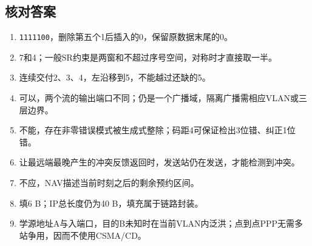 \subsection{核对答案}\label{CN03-review-answers}

\begin{enumerate}
\def\labelenumi{\arabic{enumi}.}
\tightlist
\item
  \texttt{1111100}，删除第五个1后插入的0，保留原数据末尾的0。
\item
  7和4；一般SR约束是两窗和不超过序号空间，对称时才直接取一半。
\item
  连续交付2、3、4，左沿移到5，不能越过还缺的5。
\item
  可以，两个流的输出端口不同；仍是一个广播域，隔离广播需相应VLAN或三层边界。
\item
  不能，存在非零错误模式被生成式整除；码距4可保证检出3位错、纠正1位错。
\item
  让最远端最晚产生的冲突反馈返回时，发送站仍在发送，才能检测到冲突。
\item
  不应，NAV描述当前时刻之后的剩余预约区间。
\item
  填6 B；IP总长度仍为40 B，填充属于链路封装。
\item
  学源地址A与入端口，目的B未知时在当前VLAN内泛洪；点到点PPP无需多站争用，因而不使用CSMA/CD。
\end{enumerate}
